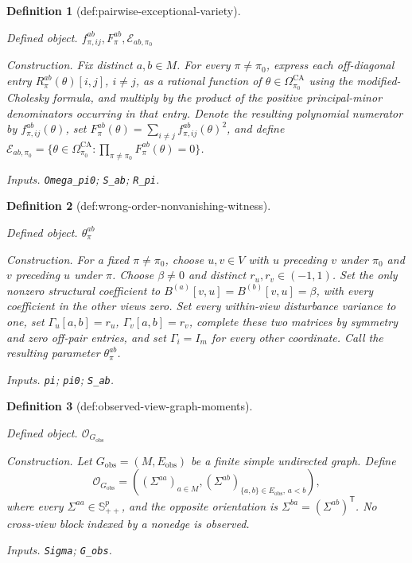 \documentclass{article}
\newtheorem{definition}{Definition}
\begin{document}
\begin{definition}[def:pairwise-exceptional-variety]\label{def:pairwise-exceptional-variety}
\par\smallskip\noindent\emph{Defined object.} \(f_{\pi,ij}^{ab},F_\pi^{ab},\mathcal E_{ab,\pi_0}\)
\par\smallskip\noindent\emph{Construction.} Fix distinct \(a,b\in M\). For every \(\pi\ne\pi_0\), express each off-diagonal entry \(R_\pi^{ab}(\theta)[i,j]\), \(i\ne j\), as a rational function of \(\theta\in\Omega_{\pi_0}^{\mathrm{CA}}\) using the modified-Cholesky formula, and multiply by the product of the positive principal-minor denominators occurring in that entry. Denote the resulting polynomial numerator by \(f_{\pi,ij}^{ab}(\theta)\), set \(F_\pi^{ab}(\theta)=\sum_{i\ne j}f_{\pi,ij}^{ab}(\theta)^2\), and define \(\mathcal E_{ab,\pi_0}=\{\theta\in\Omega_{\pi_0}^{\mathrm{CA}}:\prod_{\pi\ne\pi_0}F_\pi^{ab}(\theta)=0\}\).
\par\smallskip\noindent\emph{Inputs.} \texttt{Omega\_\allowbreak{}pi0}; \texttt{S\_\allowbreak{}ab}; \texttt{R\_\allowbreak{}pi}.
\end{definition}

\begin{definition}[def:wrong-order-nonvanishing-witness]\label{def:wrong-order-nonvanishing-witness}
\par\smallskip\noindent\emph{Defined object.} \(\theta_\pi^{ab}\)
\par\smallskip\noindent\emph{Construction.} For a fixed \(\pi\ne\pi_0\), choose \(u,v\in V\) with \(u\) preceding \(v\) under \(\pi_0\) and \(v\) preceding \(u\) under \(\pi\). Choose \(\beta\ne0\) and distinct \(r_u,r_v\in(-1,1)\). Set the only nonzero structural coefficient to \(B^{(a)}[v,u]=B^{(b)}[v,u]=\beta\), with every coefficient in the other views zero. Set every within-view disturbance variance to one, set \(\Gamma_u[a,b]=r_u\), \(\Gamma_v[a,b]=r_v\), complete these two matrices by symmetry and zero off-pair entries, and set \(\Gamma_i=I_m\) for every other coordinate. Call the resulting parameter \(\theta_\pi^{ab}\).
\par\smallskip\noindent\emph{Inputs.} \texttt{pi}; \texttt{pi0}; \texttt{S\_\allowbreak{}ab}.
\end{definition}

\begin{definition}[def:observed-view-graph-moments]\label{def:observed-view-graph-moments}
\par\smallskip\noindent\emph{Defined object.} \(\mathcal O_{G_{\mathrm{obs}}}\)
\par\smallskip\noindent\emph{Construction.} Let \(G_{\mathrm{obs}}=(M,E_{\mathrm{obs}})\) be a finite simple undirected graph.  Define
\[
\mathcal O_{G_{\mathrm{obs}}}
=\left((\Sigma^{aa})_{a\in M},
(\Sigma^{ab})_{\{a,b\}\in E_{\mathrm{obs}},\,a<b}\right),
\]
where every \(\Sigma^{aa}\in\mathbb S_{++}^p\), and the opposite orientation is \(\Sigma^{ba}=(\Sigma^{ab})^{\mathsf T}\).  No cross-view block indexed by a nonedge is observed.
\par\smallskip\noindent\emph{Inputs.} \texttt{Sigma}; \texttt{G\_\allowbreak{}obs}.
\end{definition}
\end{document}
